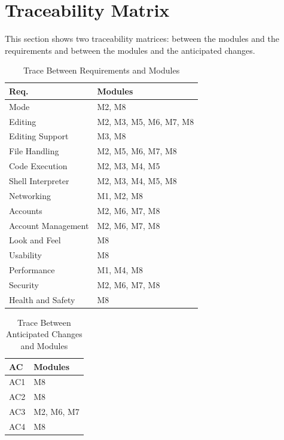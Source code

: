 \documentclass[12pt, titlepage]{article}
\begin{document}
\section{Traceability Matrix} \label{SecTM}

This section shows two traceability matrices: between the modules and the
requirements and between the modules and the anticipated changes.

\begin{table}[H]
\centering
\begin{tabular}{p{} p{}}
\toprule
\textbf{Req.} & \textbf{Modules}\\
\midrule
    Mode & M2, M8\\
    Editing & M2, M3, M5, M6, M7, M8\\
    Editing Support & M3, M8\\
    File Handling & M2, M5, M6, M7, M8\\
    Code Execution & M2, M3, M4, M5\\
    Shell Interpreter & M2, M3, M4, M5, M8\\
    Networking & M1, M2, M8\\
    Accounts & M2, M6, M7, M8\\
    Account Management & M2, M6, M7, M8\\
    Look and Feel & M8\\
    Usability & M8\\
    Performance & M1, M4, M8\\
    Security & M2, M6, M7, M8\\
    Health and Safety & M8\\
\bottomrule
\end{tabular}
\caption{Trace Between Requirements and Modules}
\label{TblRT}
\end{table}

\begin{table}[H]
\centering
\begin{tabular}{p{} p{}}
\toprule
\textbf{AC} & \textbf{Modules}\\
\midrule
    AC1 & M8\\
    AC2 & M8\\
    AC3 & M2, M6, M7\\
    AC4 & M8\\
\bottomrule
\end{tabular}
\caption{Trace Between Anticipated Changes and Modules}
\label{TblACT}
\end{table}
\end{document}

